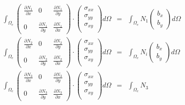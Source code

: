 \begin{eqnarray}
\int_{\Omega_e} 
\left(
\begin{array}{ccc}
\frac{\partial N_1}{\partial x} & 0 & \frac{\partial N_1}{\partial y} \\  \\
0 & \frac{\partial N_1}{\partial y} &  \frac{\partial N_1}{\partial x}  
\end{array}
\right)
\cdot
\left(
\begin{array}{c}
\sigma_{xx}\\
\sigma_{yy}\\
\sigma_{xy}\\
\end{array}
\right)
d\Omega &=& \int_{\Omega_e} N_1 
\left(
\begin{array}{c}
b_x \\ b_y
\end{array}
\right)
 d\Omega \\
\int_{\Omega_e} 
\left(
\begin{array}{ccc}
\frac{\partial N_2}{\partial x} & 0 & \frac{\partial N_2}{\partial y} \\  \\
0 & \frac{\partial N_2}{\partial y} &  \frac{\partial N_2}{\partial x}  
\end{array}
\right)
\cdot
\left(
\begin{array}{c}
\sigma_{xx}\\
\sigma_{yy}\\
\sigma_{xy}\\
\end{array}
\right)
d\Omega &=& \int_{\Omega_e} N_i 
\left(
\begin{array}{c}
b_x \\ b_y
\end{array}
\right)
d\Omega \\
\int_{\Omega_e} 
\left(
\begin{array}{ccc}
\frac{\partial N_3}{\partial x} & 0 & \frac{\partial N_3}{\partial y} \\  \\
0 & \frac{\partial N_3}{\partial y} &  \frac{\partial N_3}{\partial x}  
\end{array}
\right)
\cdot
\left(
\begin{array}{c}
\sigma_{xx}\\
\sigma_{yy}\\
\sigma_{xy}\\
\end{array}
\right)
d\Omega &=& \int_{\Omega_e} N_3 

\end{eqnarray}
